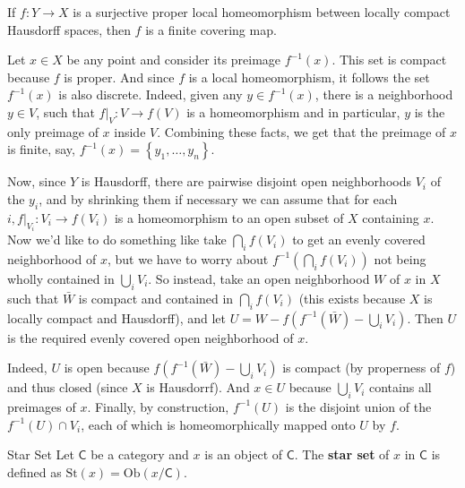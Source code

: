 \documentclass{report}
\begin{document}
\begin{proposition}{}{}
	If $f: Y \rightarrow X$ is a surjective proper local homeomorphism between locally compact Hausdorff spaces, then $f$ is a finite covering map.
\end{proposition}
\begin{prf}
	Let $x \in X$ be any point and consider its preimage $f^{-1}(x)$. This set is compact because $f$ is proper. And since $f$ is a local homeomorphism, it follows the set $f^{-1}(x)$ is also discrete. Indeed, given any $y \in f^{-1}(x)$, there is a neighborhood $y \in V$, such that $\left.f\right|_V: V \rightarrow f(V)$ is a homeomorphism and in particular, $y$ is the only preimage of $x$ inside $V$. Combining these facts, we get that the preimage of $x$ is finite, say, $f^{-1}(x)=\left\{y_1, \ldots, y_n\right\}$.

	Now, since $Y$ is Hausdorff, there are pairwise disjoint open neighborhoods $V_i$ of the $y_i$, and by shrinking them if necessary we can assume that for each $i,\left.f\right|_{V_i}: V_i \rightarrow f\left(V_i\right)$ is a homeomorphism to an open subset of $X$ containing $x$. Now we'd like to do something like take $\bigcap_i f\left(V_i\right)$ to get an evenly covered neighborhood of $x$, but we have to worry about $f^{-1}\left(\bigcap_i f\left(V_i\right)\right)$ not being wholly contained in $\bigcup_i V_i$. So instead, take an open neighborhood $W$ of $x$ in $X$ such that $\bar{W}$ is compact and contained in $\bigcap_i f\left(V_i\right)$ (this exists because $X$ is locally compact and Hausdorff), and let $U=W -f\left(f^{-1}(\bar{W}) - \bigcup_i V_i\right)$. Then $U$ is the required evenly covered open neighborhood of $x$.

	Indeed, $U$ is open because $f\left(f^{-1}(\bar{W}) -\bigcup_i V_i\right)$ is compact (by properness of $f$) and thus closed (since $X$ is Hausdorrf). And $x \in U$ because $\bigcup_i V_i$ contains all preimages of $x$. Finally, by construction, $f^{-1}(U)$ is the disjoint union of the $f^{-1}(U) \cap V_i$, each of which is homeomorphically mapped onto $U$ by $f$.
\end{prf}


\begin{definition}{Star Set}{}
	Let $\mathsf{C}$ be a category and $x$ is an object of $\mathsf{C}$. The \textbf{star set} of $x$ in $\mathsf{C}$ is defined as
	$\mathrm{St}(x)=\mathrm{Ob}\left(x/\mathsf{C}\right)$.
\end{definition}
\end{document}
